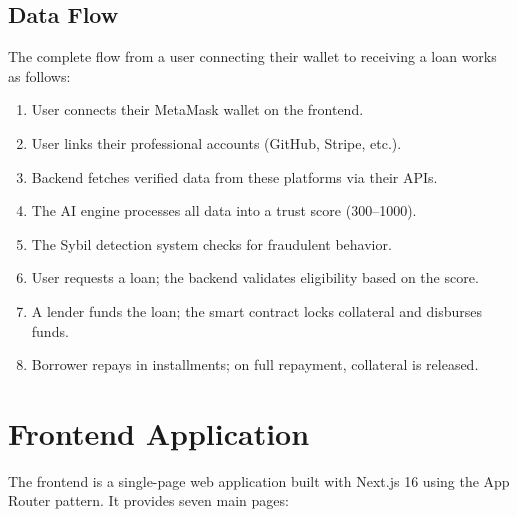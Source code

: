 \documentclass[12pt, a4paper]{article}
\begin{document}
\subsection{Data Flow}

The complete flow from a user connecting their wallet to receiving a loan works as follows:

\begin{enumerate}[nosep]
    \item User connects their MetaMask wallet on the frontend.
    \item User links their professional accounts (GitHub, Stripe, etc.).
    \item Backend fetches verified data from these platforms via their APIs.
    \item The AI engine processes all data into a trust score (300--1000).
    \item The Sybil detection system checks for fraudulent behavior.
    \item User requests a loan; the backend validates eligibility based on the score.
    \item A lender funds the loan; the smart contract locks collateral and disburses funds.
    \item Borrower repays in installments; on full repayment, collateral is released.
\end{enumerate}


\section{Frontend Application}

The frontend is a single-page web application built with Next.js 16 using the App Router pattern. It provides seven main pages:
\end{document}
